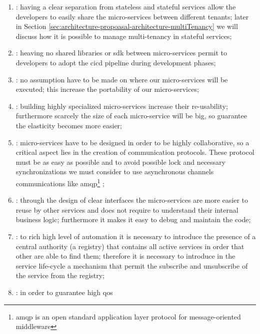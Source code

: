 \begin{enumerate}
	\item{: having a clear separation from
		stateless and stateful services allow the developers to easily share the micro-services between
		different tenants; later in Section \ref{sec:architecture-propoasal-architecture-multiTenancy}
		we will discuss how it is possible to manage multi-tenancy in stateful services;}
	\item{: heaving no shared libraries or \ac{sdk} between
		micro-services permit to developers to adopt the \ac{cicd} pipeline during development phases;}
	\item{: no assumption have to be made on where our micro-services will
		be executed; this increase the portability of our micro-services;}
	\item{: building highly specialized micro-services
		increase their re-usability; furthermore scarcely the size of each micro-service will be big, so
		guarantee the elasticity becomes more easier;}
	\item{: micro-services have to be
		designed in order to be highly collaborative, so a critical aspect lies in the creation of
		communication protocols. These protocol must be as easy as possible and to avoid possible lock 
		and necessary synchronizations we must consider to use asynchronous channels communications
		like \ac{amqp}\footnote{\ac{amqp} is an open standard application layer protocol for
		message-oriented middleware} \cite{amqpProtocol};}
	\item{: through the design of clear
		interfaces the micro-services are more easier to reuse by other services and does not require
		to understand their internal business logic; furthermore it makes it easy to debug and maintain
		the code;}
	\item{: to rich high level of
		automation it is necessary to introduce the presence of a central authority (a registry) that
		contains all active services in order that other are able to find them; therefore it is necessary to
		introduce in the service life-cycle a mechanism that permit the subscribe and unsubscribe of
		the service from the registry;}
	\item{: in order to guarantee high \ac{qos}
}
\end{enumerate}

